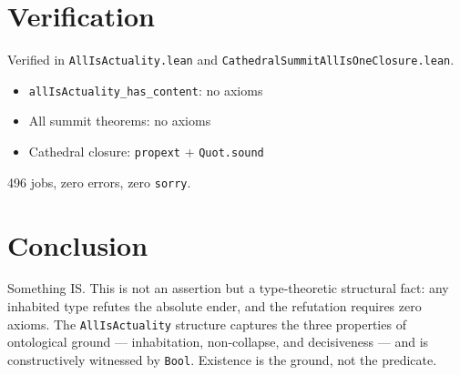 \documentclass[12pt,a4paper]{article}
\begin{document}
\section{Verification}

Verified in \texttt{AllIsActuality.lean} and
\texttt{CathedralSummitAllIsOneClosure.lean}.

\begin{itemize}
    \item \texttt{allIsActuality\_has\_content}: no axioms
    \item All summit theorems: no axioms
    \item Cathedral closure: \texttt{propext} + \texttt{Quot.sound}
\end{itemize}

496 jobs, zero errors, zero \texttt{sorry}.

\section{Conclusion}

Something IS. This is not an assertion but a type-theoretic structural
fact: any inhabited type refutes the absolute ender, and the refutation
requires zero axioms. The \texttt{AllIsActuality} structure captures
the three properties of ontological ground --- inhabitation, non-collapse,
and decisiveness --- and is constructively witnessed by \texttt{Bool}.
Existence is the ground, not the predicate.
\end{document}
